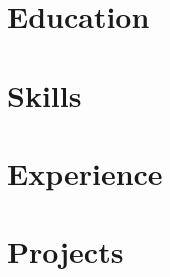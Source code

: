 \documentclass[letterpaper,11pt]{article}
\begin{document}
\newcommand{\resumeRole}{Machine Learning Engineer}
\newcommand{\resumeJobTitleGulzar}{Machine Learning Engineer}



\section{Education}


\vspace{-10pt}
\section{Skills}


\section{Experience}
\resumeSubHeadingListStart
  
  
  
  
\resumeSubHeadingListEnd

\section{Projects}
\resumeSubHeadingListStart
  
  
  
\resumeSubHeadingListEnd
\end{document}
